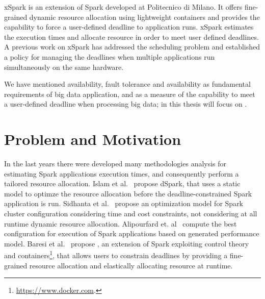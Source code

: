 xSpark is an extension of Spark developed at Politecnico di Milano. It offers fine-grained dynamic resource allocation using lightweight containers and provides the capability to force a user-defined deadline to application runs. xSpark estimates the execution times and allocate resource in order to meet user defined deadlines. A previous work on xSpark has addressed the scheduling problem and established a policy for managing the deadlines when multiple applications run simultaneously on the same hardware.

We have mentioned availability, fault tolerance and availability as fundamental requirements of big data application, and \qos as a measure of the capability to meet a user-defined deadline when processing big data; in this thesis will focus on \qos.

\section{Problem and Motivation}\label{sec:problem_motivation}
In the last years there were developed many methodologies analysis for estimating Spark applications execution times, and consequently perform a tailored resource allocation. 
Islam et al.~\cite{dSpark} propose dSpark, that uses a static model to optimze the resource allocation before the deadline-constrained Spark application is run. Sidhanta et al.~\cite{Sidhanta2016} propose an optimization model for Spark cluster configuration considering time and cost constraints, not considering at all runtime dynamic resource allocation. Alipourfard et. al~\cite{Alipourfard} compute the best configuration for execution of Spark applications based on generated performance model. Baresi et al.~\cite{xsparkreport, Quattrocchi2018} propose \cSpark, an extension of Spark exploiting control theory and containers\footnote{\url{https://www.docker.com}.}, that allows users to constrain deadlines by providing a fine-grained resource allocation and elastically allocating resource at runtime.




